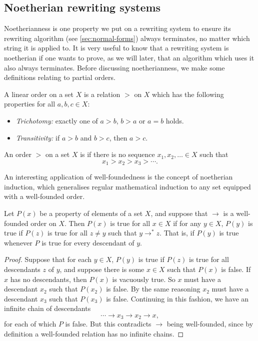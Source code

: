 \documentclass[noindex,noinsetproof,emphthm,12pt]{lmaths}
\begin{document}
\subsection{Noetherian rewriting systems}

Noetherianness is one property we put on a rewriting system to ensure its rewriting algorithm (see \ref{sec:normal-forms}) always terminates, no matter which string it is applied to. It is very useful to know that a rewriting system is noetherian if one wants to prove, as we will later, that an algorithm which uses it also always terminates. Before discussing noetherianness, we make some definitions relating to partial orders.

\begin{defn}
	A linear order on a set $X$ is a relation $>$ on $X$ which has the following properties for all $a, b, c \in X$:
	\begin{itemize}
		\item \emph{Trichotomy:} exactly one of $a > b$, $b > a$ or $a = b$ holds.
		\item \emph{Transitivity:} if $a > b$ and $b > c$, then $a > c$.
	\end{itemize}
\end{defn}

\begin{defn}
	An order $>$ on a set $X$ is  if there is no sequence $x_1, x_2, \ldots \in X$ such that
	\[ x_1 > x_2 > x_3 > \cdots. \]
\end{defn}

An interesting application of well-foundedness is the concept of noetherian induction, which generalises regular mathematical induction to any set equipped with a well-founded order.

\begin{prop} \label{prop:noetherian-induction}
	Let $P(x)$ be a property of elements of a set $X$, and suppose that $\rightarrow$ is a well-founded order on $X$. Then $P(x)$ is true for all $x \in X$ if for any $y \in X$, $P(y)$ is true if $P(z)$ is true for all $z \ne y$ such that $y \rightarrow^* z$. That is, if $P(y)$ is true whenever $P$ is true for every descendant of $y$.
\end{prop}
\begin{proof}
	Suppose that for each $y \in X$, $P(y)$ is true if $P(z)$ is true for all descendants $z$ of $y$, and suppose there is some $x \in X$ such that $P(x)$ is false. If $x$ has no descendants, then $P(x)$ is vacuously true. So $x$ must have a descendant $x_2$ such that $P(x_2)$ is false. By the same reasoning $x_2$ must have a descendant $x_3$ such that $P(x_3)$ is false. Continuing in this fashion, we have an infinite chain of descendants
		\[ \cdots \to x_3 \to x_2 \to x, \]
	for each of which $P$ is false. But this contradicts $\to$ being well-founded, since by definition a well-founded relation has no infinite chains.
\end{proof}
\end{document}
